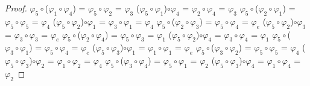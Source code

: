 \documentclass[10pt,a4paper,oneside]{article}
\begin{document}
\begin{proof}
				\newline
				$\varphi_{5}\circ$($\varphi_{1}\circ\varphi_{4}$) = $\varphi_{5}\circ\varphi_{2}$ = $\varphi_{3}$
				\newline
				($\varphi_{5}\circ\varphi_{1}$)$\circ\varphi_{4}$ = $\varphi_{2}\circ\varphi_{4}$ = $\varphi_{3}$
				\newline
				\newline
				$\varphi_{5}\circ$($\varphi_{2}\circ\varphi_{1}$) = $\varphi_{5}\circ\varphi_{5}$ = $\varphi_{4}$
				\newline
				($\varphi_{5}\circ\varphi_{2}$)$\circ\varphi_{1}$ = $\varphi_{3}\circ\varphi_{1}$ = $\varphi_{4}$
				\newline
				\newline
				$\varphi_{5}\circ$($\varphi_{2}\circ\varphi_{3}$) = $\varphi_{5}\circ\varphi_{4}$ = $\varphi_{e}$
				\newline
				($\varphi_{5}\circ\varphi_{2}$)$\circ\varphi_{3}$ = $\varphi_{3}\circ\varphi_{3}$ = $\varphi_{e}$
				\newline
				\newline
				$\varphi_{5}\circ$($\varphi_{2}\circ\varphi_{4}$) = $\varphi_{5}\circ\varphi_{3}$ = $\varphi_{1}$
				\newline
				($\varphi_{5}\circ\varphi_{2}$)$\circ\varphi_{4}$ = $\varphi_{3}\circ\varphi_{4}$ = $\varphi_{1}$
				\newline
				\newline
				$\varphi_{5}\circ$($\varphi_{3}\circ\varphi_{1}$) = $\varphi_{5}\circ\varphi_{4}$ = $\varphi_{e}$
				\newline
				($\varphi_{5}\circ\varphi_{3}$)$\circ\varphi_{1}$ = $\varphi_{1}\circ\varphi_{1}$ = $\varphi_{e}$
				\newline
				\newline
				$\varphi_{5}\circ$($\varphi_{3}\circ\varphi_{2}$) = $\varphi_{5}\circ\varphi_{5}$ = $\varphi_{4}$
				\newline
				($\varphi_{5}\circ\varphi_{3}$)$\circ\varphi_{2}$ = $\varphi_{1}\circ\varphi_{2}$ = $\varphi_{4}$
				\newline
				\newline
				$\varphi_{5}\circ$($\varphi_{3}\circ\varphi_{4}$) = $\varphi_{5}\circ\varphi_{1}$ = $\varphi_{2}$
				\newline
				($\varphi_{5}\circ\varphi_{3}$)$\circ\varphi_{4}$ = $\varphi_{1}\circ\varphi_{4}$ = $\varphi_{2}$
				\newline
				\newline

\end{proof}
\end{document}
